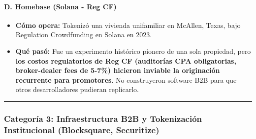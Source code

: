 \documentclass[
]{article}
\providecommand{\tightlist}{%
  \setlength{\itemsep}{0pt}\setlength{\parskip}{0pt}}
\begin{document}
\paragraph{D. Homebase (Solana - Reg
CF)}\label{d.-homebase-solana---reg-cf}

\begin{itemize}
\tightlist
\item
  \textbf{Cómo opera:} Tokenizó una vivienda unifamiliar en McAllen,
  Texas, bajo Regulation Crowdfunding en Solana en 2023.
\item
  \textbf{Qué pasó:} Fue un experimento histórico pionero de una sola
  propiedad, pero \textbf{los costos regulatorios de Reg CF (auditorías
  CPA obligatorias, broker-dealer fees de 5-7\%) hicieron inviable la
  originación recurrente para promotores}. No construyeron software B2B
  para que otros desarrolladores pudieran replicarlo.
\end{itemize}

\begin{center}\rule{0.5\linewidth}{0.5pt}\end{center}

\subsubsection{Categoría 3: Infraestructura B2B y Tokenización
Institucional (Blocksquare,
Securitize)}\label{categoruxeda-3-infraestructura-b2b-y-tokenizaciuxf3n-institucional-blocksquare-securitize}
\end{document}
